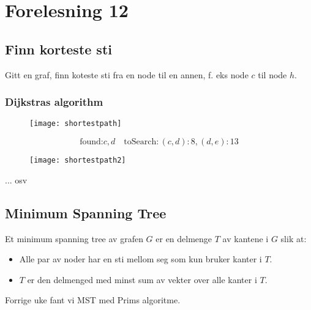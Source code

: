 \documentclass{article}
\begin{document}
    \section{Forelesning 12}

    \subsection{Finn korteste sti}
    Gitt en graf, finn koteste sti fra en node til en annen, f. eks node \( c \) til node \( h \).

    \subsubsection{Dijkstras algorithm}

    \begin{figure}[H]
        \begin{center}
            \texttt{[image: shortestpath]}
        \end{center}
    \end{figure}

    \[ \text{found:} c,d \quad \text{toSearch}: \left( c,d \right):8, \left( d,e \right):13 \]

    \begin{figure}[H]
        \begin{center}
            \texttt{[image: shortestpath2]}
        \end{center}
    \end{figure}

    ... osv

    \subsection{Minimum Spanning Tree}
    Et minimum spanning tree av grafen \( G \) er en delmenge \( T \) av kantene i \( G \) slik at:

    \begin{itemize}
        \item Alle par av noder har en sti mellom seg som kun bruker kanter i \( T \).
        \item \( T \) er den delmenged med minst sum av vekter over alle kanter i \( T \).
    \end{itemize}

    Forrige uke fant vi MST med Prims algoritme.
\end{document}
